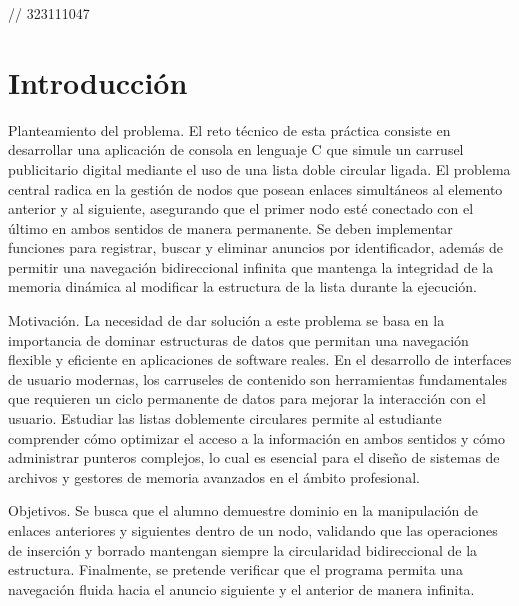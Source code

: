 // 323111047

\section{Introducción}

Planteamiento del problema. El reto técnico de esta práctica consiste en desarrollar una aplicación de consola en lenguaje C que simule un carrusel publicitario digital mediante el uso de una lista doble circular ligada. El problema central radica en la gestión de nodos que posean enlaces simultáneos al elemento anterior y al siguiente, asegurando que el primer nodo esté conectado con el último en ambos sentidos de manera permanente. Se deben implementar funciones para registrar, buscar y eliminar anuncios por identificador, además de permitir una navegación bidireccional infinita que mantenga la integridad de la memoria dinámica al modificar la estructura de la lista durante la ejecución.

\vspace{0.4cm}

Motivación. La necesidad de dar solución a este problema se basa en la importancia de dominar estructuras de datos que permitan una navegación flexible y eficiente en aplicaciones de software reales. En el desarrollo de interfaces de usuario modernas, los carruseles de contenido son herramientas fundamentales que requieren un ciclo permanente de datos para mejorar la interacción con el usuario. Estudiar las listas doblemente circulares permite al estudiante comprender cómo optimizar el acceso a la información en ambos sentidos y cómo administrar punteros complejos, lo cual es esencial para el diseño de sistemas de archivos y gestores de memoria avanzados en el ámbito profesional.

\vspace{0.4cm}

Objetivos. Se busca que el alumno demuestre dominio en la manipulación de enlaces anteriores y siguientes dentro de un nodo, validando que las operaciones de inserción y borrado mantengan siempre la circularidad bidireccional de la estructura. Finalmente, se pretende verificar que el programa permita una navegación fluida hacia el anuncio siguiente y el anterior de manera infinita.